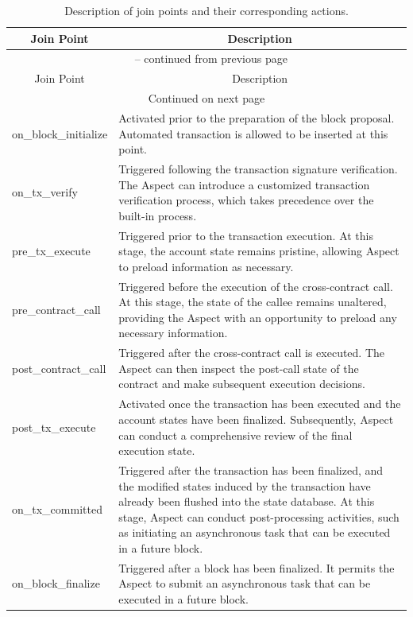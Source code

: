 \begin{longtable}{p{4cm}p{10cm}} %
    \caption{Description of join points and their corresponding actions.}
    \label{tab:join-points-table} %
    \\
    \toprule
    \multicolumn{1}{c}{Join Point} & \multicolumn{1}{c}{Description} \\
    \midrule
    \endfirsthead
    
    \multicolumn{2}{c}{{\tablename\ \thetable{} -- continued from previous page}} \\
    \midrule
    \multicolumn{1}{c}{Join Point} & \multicolumn{1}{c}{Description} \\
    \midrule
    \endhead
    
    \midrule
    \multicolumn{2}{c}{{Continued on next page}} \\
    \endfoot
    
    \bottomrule
    \endlastfoot
    
    on\_block\_initialize & Activated prior to the preparation of the block proposal. Automated transaction is allowed to be inserted at this point. \\[20pt]
    on\_tx\_verify & Triggered following the transaction signature verification. The Aspect can introduce a customized transaction verification process, which takes precedence over the built-in process. \\[30pt]
    pre\_tx\_execute & Triggered prior to the transaction execution. At this stage, the account state remains pristine, allowing Aspect to preload information as necessary. \\[30pt]
    pre\_contract\_call & Triggered before the execution of the cross-contract call. At this stage, the state of the callee remains unaltered, providing the Aspect with an opportunity to preload any necessary information. \\[30pt]
    post\_contract\_call & Triggered after the cross-contract call is executed. The Aspect can then inspect the post-call state of the contract and make subsequent execution decisions. \\[30pt]
    post\_tx\_execute & Activated once the transaction has been executed and the account states have been finalized. Subsequently, Aspect can conduct a comprehensive review of the final execution state. \\[30pt]
    on\_tx\_committed & Triggered after the transaction has been finalized, and the modified states induced by the transaction have already been flushed into the state database. At this stage, Aspect can conduct post-processing activities, such as initiating an asynchronous task that can be executed in a future block. \\[60pt]
    on\_block\_finalize & Triggered after a block has been finalized. It permits the Aspect to submit an asynchronous task that can be executed in a future block. \\[30pt]
\end{longtable}


